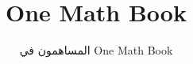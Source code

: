 \documentclass[11pt,a4paper,twoside,openany]{book}
\title{One Math Book}
\author{المساهمون في One Math Book}
\date{\bookdate}
\begin{document}
\frontmatter



\tableofcontents

\mainmatter



\appendix
\part{\omsolutionspart}


\backmatter
\printindex
\end{document}
